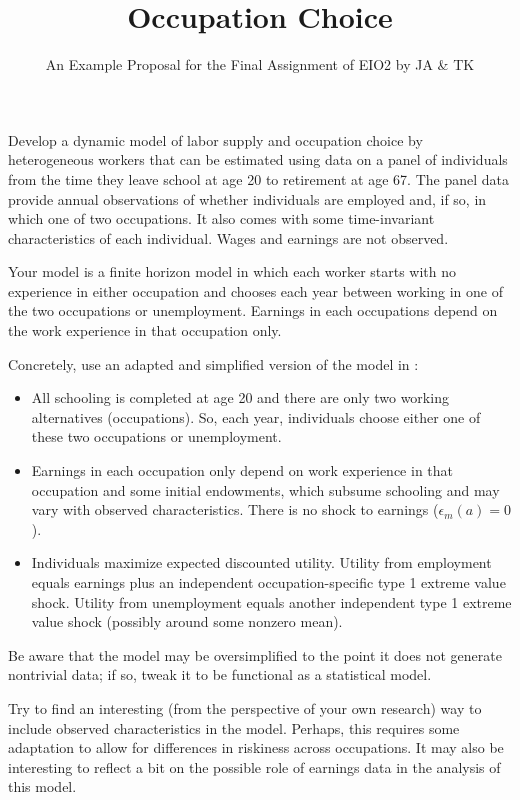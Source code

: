 \documentclass[fleqn,12pt]{article}
\title{Occupation Choice}
\author{An Example Proposal for the Final Assignment of EIO2 by JA \& TK}
\date{}
\begin{document}
\maketitle

Develop a dynamic model of labor supply and occupation choice by heterogeneous workers that can be estimated using data on a panel of individuals from the time they leave school at age 20 to retirement at age 67. The panel data provide annual observations of whether individuals are employed and, if so, in which one of two occupations. It also comes with some time-invariant characteristics of each individual. Wages and earnings are not observed. 

Your model is a finite horizon model in which each worker starts with no experience in either occupation and chooses each year between working in one of the two occupations or unemployment. Earnings in each occupations depend on the work experience in that occupation only. 

Concretely, use an adapted and simplified version of the model in \citet[][Section I]{jpe97:ecksteinwolpin}:
\begin{itemize}
\item All schooling is completed at age 20 and there are only two working alternatives (occupations). So, each year, individuals choose either one of these two occupations or unemployment.
\item Earnings in each occupation only depend on work experience in that occupation and some initial endowments, which subsume schooling and may vary with observed characteristics. There is no shock to earnings ($\epsilon_m(a)=0$).
\item Individuals maximize expected discounted utility. Utility from employment equals earnings plus an independent occupation-specific type 1 extreme value shock. Utility from unemployment equals another independent type 1 extreme value shock (possibly around some nonzero mean).
\end{itemize}
Be aware that the model may be oversimplified to the point it does not generate nontrivial data; if so, tweak it to be functional as a statistical model. 

Try to find an interesting (from the perspective of your own research) way to include observed characteristics in the model. Perhaps, this requires some adaptation to allow for differences in riskiness across occupations. It may also be interesting to reflect a bit on the possible role of earnings data in the analysis of this model.



\end{document}
